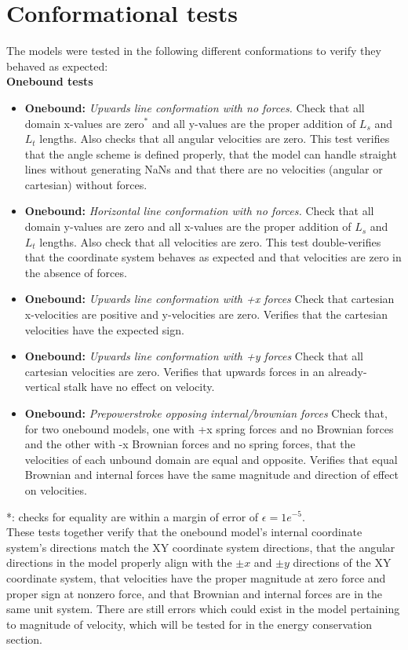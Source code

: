 \documentclass[
11pt, %
english, %
singlespacing, %
headsepline, %
chapterinoneline, %
]{MastersDoctoralThesis} %
\begin{document}
\chapter{Conformational tests}
\label{sec:conformational-tests}
The models were tested in the following different conformations to verify they behaved as expected:\\

\textbf{Onebound tests}
\begin{itemize}
\item \textbf{Onebound:} \textit{Upwards line conformation with no forces.} Check that all domain x-values are zero$^*$ and all y-values are the proper addition of $L_s$ and $L_t$ lengths. Also checks that all angular velocities are zero. This test verifies that the angle scheme is defined properly, that the model can handle straight lines without generating NaNs and that there are no velocities (angular or cartesian) without forces.
\item \textbf{Onebound:} \textit{Horizontal line conformation with no forces.} Check that all domain y-values are zero and all x-values are the proper addition of $L_s$ and $L_t$ lengths. Also check that all velocities are zero. This test double-verifies that the coordinate system behaves as expected and that velocities are zero in the absence of forces.
\item \textbf{Onebound:} \textit{Upwards line conformation with +x forces} Check that cartesian x-velocities are positive and y-velocities are zero. Verifies that the cartesian velocities have the expected sign.
\item \textbf{Onebound:} \textit{Upwards line conformation with +y forces} Check that all cartesian velocities are zero. Verifies that upwards forces in an already-vertical stalk have no effect on velocity.
  \item \textbf{Onebound:} \textit{Prepowerstroke opposing internal/brownian forces} Check that, for two onebound models, one with +x spring forces and no Brownian forces and the other with -x Brownian forces and no spring forces, that the velocities of each unbound domain are equal and opposite. Verifies that equal Brownian and internal forces have the same magnitude and direction of effect on velocities.
\end{itemize}
*: checks for equality are within a margin of error of $\epsilon = 1e^{-5}$.\\

These tests together verify that the onebound model's internal coordinate system's directions match the XY coordinate system directions, that the angular directions in the model properly align with the $\pm x$ and $\pm y$ directions of the XY coordinate system, that velocities have the proper magnitude at zero force and proper sign at nonzero force, and that Brownian and internal forces are in the same unit system. There are still errors which could exist in the model pertaining to magnitude of velocity, which will be tested for in the energy conservation section.\\
\end{document}
